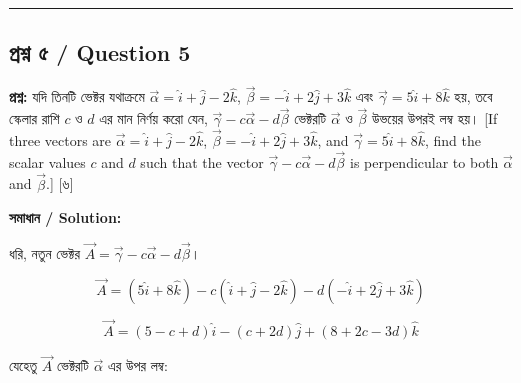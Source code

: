 \documentclass[11pt, a4paper]{article}
\begin{document}
\vspace{1em}
\begin{center}
\end{center}

\vspace{1em}
\noindent\rule{\textwidth}{0.4pt}
\vspace{1em}

\subsection*{প্রশ্ন ৫ / Question 5}
\textbf{প্রশ্ন:} যদি তিনটি ভেক্টর যথাক্রমে $\vec{\alpha} = \hat{i} + \hat{j} - 2\hat{k}$, $\vec{\beta} = -\hat{i} + 2\hat{j} + 3\hat{k}$ এবং $\vec{\gamma} = 5\hat{i} + 8\hat{k}$ হয়, তবে স্কেলার রাশি $c$ ও $d$ এর মান নির্ণয় করো যেন, $\vec{\gamma} - c\vec{\alpha} - d\vec{\beta}$ ভেক্টরটি $\vec{\alpha}$ ও $\vec{\beta}$ উভয়ের উপরই লম্ব হয়। [If three vectors are $\vec{\alpha} = \hat{i} + \hat{j} - 2\hat{k}$, $\vec{\beta} = -\hat{i} + 2\hat{j} + 3\hat{k}$, and $\vec{\gamma} = 5\hat{i} + 8\hat{k}$, find the scalar values $c$ and $d$ such that the vector $\vec{\gamma} - c\vec{\alpha} - d\vec{\beta}$ is perpendicular to both $\vec{\alpha}$ and $\vec{\beta}$.] [৬]

\vspace{0.8em}
\textbf{সমাধান / Solution:}

ধরি, নতুন ভেক্টর $\vec{A} = \vec{\gamma} - c\vec{\alpha} - d\vec{\beta}$।

$$\vec{A} = (5\hat{i} + 8\hat{k}) - c(\hat{i} + \hat{j} - 2\hat{k}) - d(-\hat{i} + 2\hat{j} + 3\hat{k})$$

$$\vec{A} = (5 - c + d)\hat{i} - (c + 2d)\hat{j} + (8 + 2c - 3d)\hat{k}$$

যেহেতু $\vec{A}$ ভেক্টরটি $\vec{\alpha}$ এর উপর লম্ব:
\end{document}
